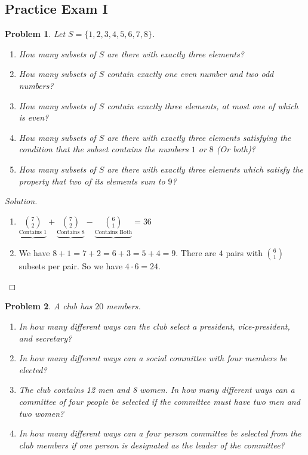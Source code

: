 \documentclass[oneside]{book}
\theoremstyle{mystyle}
\newtheorem{problem}{Problem}[section]
\begin{document}
\subsection{Practice Exam I}
\begin{problem}
Let $S = \{1,2,3,4,5,6,7,8\}$.
\begin{enumerate}
    \item How many subsets of $S$ are there with exactly three elements?
    \item How many subsets of $S$ contain exactly one even number and two odd numbers?
    \item How many subsets of $S$ contain exactly three elements, at most one of which is even?
    \item How many subsets of $S$ are there with exactly three elements satisfying the condition that the subset contains the numbers $1$ or $8$ (Or both)?
    \item How many subsets of $S$ are there with exactly three elements which satisfy the property that two of its elements sum to $9$?
\end{enumerate}
\end{problem}
\begin{proof}[Solution]
\ 
\begin{enumerate}
\begin{multicols}{3}
    \item $\binom{8}{3} = \frac{8!}{3!(8-3)!} = 56$
    \item $\binom{4}{1}\binom{4}{2} = 24$
    \item $\binom{4}{1} \binom{4}{2} + \binom{4}{0} \binom{4}{3} = 28$.
\end{multicols}
    \item $\underbrace{\underset{\textrm{Contains $1$}}{\binom{7}{2}}} + \underbrace{\underset{\textrm{Contains $8$}}{\binom{7}{2}}} - \underbrace{\underset{\textrm{Contains Both}}{\binom{6}{1}}} = 36$
    \item We have $8+1=7+2=6+3=5+4= 9$. There are $4$ pairs with $\binom{6}{1}$ subsets per pair. So we have $4\cdot 6 = 24$.
\end{enumerate}
\end{proof}
\begin{problem}
A club has $20$ members.
\begin{enumerate}
    \item In how many different ways can the club select a president, vice-president, and secretary?
    \item In how many different ways can a social committee with four members be elected?
    \item The club contains 12 men and 8 women. In how many different ways can a committee of four people be selected if the committee must have two men and two women?
    \item In how many different ways can a four person committee be selected from the club members if one person is designated as the leader of the committee?
\end{enumerate}
\end{problem}
\end{document}

